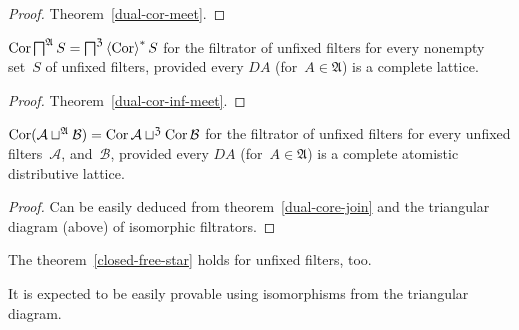 \begin{proof}
Theorem~\ref{dual-cor-meet}.
\end{proof}

\begin{prop}
$\operatorname{Cor}\bigsqcap^{\mathfrak{A}}S=\bigsqcap^{\mathfrak{Z}}\left\langle \operatorname{Cor}\right\rangle ^{\ast}S$ for the filtrator of unfixed filters for
every nonempty set~$S$ of unfixed filters, provided
every $DA$ (for~$A\in\mathfrak{A}$) is a complete lattice.
\end{prop}

\begin{proof}
Theorem~\ref{dual-cor-inf-meet}.
\end{proof}

\begin{prop}
$\operatorname{Cor}(\mathcal{A}\sqcup^{\mathfrak{A}}\mathcal{B}) =
\operatorname{Cor}\mathcal{A}\sqcup^{\mathfrak{Z}}\operatorname{Cor}\mathcal{B}$ for the filtrator of unfixed filters for every unfixed filters~$\mathcal{A}$, and~$\mathcal{B}$, provided
every $DA$ (for~$A\in\mathfrak{A}$) is a complete atomistic
distributive lattice.
\end{prop}

\begin{proof}
Can be easily deduced from theorem~\ref{dual-core-join}
and the triangular diagram (above) of isomorphic filtrators.
\end{proof}

\begin{conjecture}
The theorem~\ref{closed-free-star} holds for unfixed
filters, too.
\end{conjecture}

It is expected to be easily provable using isomorphisms from
the triangular diagram.
